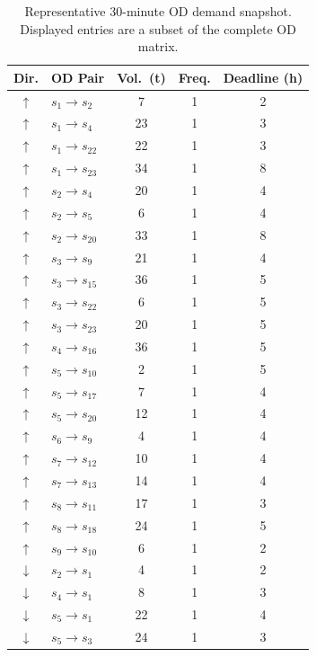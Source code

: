 \documentclass[11pt]{article}
\begin{document}
\begin{table}[!htbp]
	\centering
	\footnotesize
	\setlength{\tabcolsep}{3pt}
	\caption{Representative 30-minute OD demand snapshot. Displayed entries are a subset of the complete OD matrix.\label{AppTab:odSnapshot}}
	\begin{tabular}{clccc}
		\toprule
		\textbf{Dir.} & \textbf{OD Pair} & \textbf{Vol.\ (t)} & \textbf{Freq.} & \textbf{Deadline (h)} \\
		\midrule
		$\uparrow$ & $s_1 \to s_2$ & 7 & 1 & 2 \\
		$\uparrow$ & $s_1 \to s_4$ & 23 & 1 & 3 \\
		$\uparrow$ & $s_1 \to s_{22}$ & 22 & 1 & 3 \\
		$\uparrow$ & $s_1 \to s_{23}$ & 34 & 1 & 8 \\
		$\uparrow$ & $s_2 \to s_4$ & 20 & 1 & 4 \\
		$\uparrow$ & $s_2 \to s_5$ & 6 & 1 & 4 \\
		$\uparrow$ & $s_2 \to s_{20}$ & 33 & 1 & 8 \\
		$\uparrow$ & $s_3 \to s_9$ & 21 & 1 & 4 \\
		$\uparrow$ & $s_3 \to s_{15}$ & 36 & 1 & 5 \\
		$\uparrow$ & $s_3 \to s_{22}$ & 6 & 1 & 5 \\
		$\uparrow$ & $s_3 \to s_{23}$ & 20 & 1 & 5 \\
		$\uparrow$ & $s_4 \to s_{16}$ & 36 & 1 & 5 \\
		$\uparrow$ & $s_5 \to s_{10}$ & 2 & 1 & 5 \\
		$\uparrow$ & $s_5 \to s_{17}$ & 7 & 1 & 4 \\
		$\uparrow$ & $s_5 \to s_{20}$ & 12 & 1 & 4 \\
		$\uparrow$ & $s_6 \to s_9$ & 4 & 1 & 4 \\
		$\uparrow$ & $s_7 \to s_{12}$ & 10 & 1 & 4 \\
		$\uparrow$ & $s_7 \to s_{13}$ & 14 & 1 & 4 \\
		$\uparrow$ & $s_8 \to s_{11}$ & 17 & 1 & 3 \\
		$\uparrow$ & $s_8 \to s_{18}$ & 24 & 1 & 5 \\
		$\uparrow$ & $s_9 \to s_{10}$ & 6 & 1 & 2 \\
		\midrule
		$\downarrow$ & $s_2 \to s_1$ & 4 & 1 & 2 \\
		$\downarrow$ & $s_4 \to s_1$ & 8 & 1 & 3 \\
		$\downarrow$ & $s_5 \to s_1$ & 22 & 1 & 4 \\
		$\downarrow$ & $s_5 \to s_3$ & 24 & 1 & 3 \\

\end{tabular}
\end{table}
\end{document}
